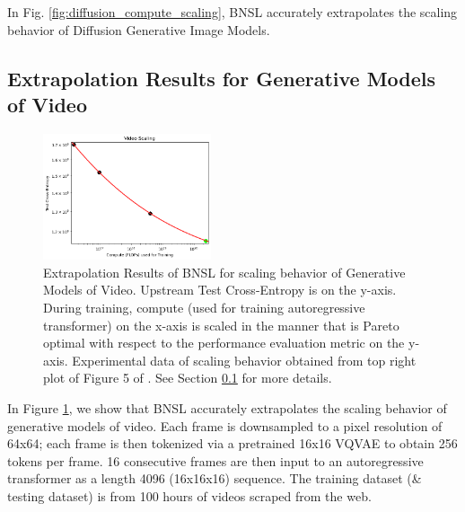 \documentclass{article} %
\begin{document}
\vspace{-2.0mm}

In Fig. \ref{fig:diffusion_compute_scaling}, BNSL accurately extrapolates the scaling behavior of Diffusion Generative Image Models.

\FloatBarrier

\subsection{Extrapolation Results for Generative Models of Video}
\label{section:video}

\vspace{-3.3mm}

\begin{figure}[htbp]
    \centering
\includegraphics[width=0.44\textwidth]{figures/video/video__compute.png}

\vspace{-3.3mm}

    \caption{
Extrapolation Results of BNSL for scaling behavior of Generative Models of Video. Upstream Test Cross-Entropy is on the y-axis. During training, compute (used for training autoregressive transformer) on the x-axis is scaled in the manner that is Pareto optimal with respect to the performance evaluation metric on the y-axis. Experimental data of scaling behavior obtained from top right plot of Figure 5 of \cite{2020arXiv201014701H}. See Section \ref{section:video} for more details.
    }
    \label{fig:video_compute_scaling}
\end{figure}

\vspace{-2.0mm}

In Figure \ref{fig:video_compute_scaling}, we show that BNSL accurately extrapolates the scaling behavior of generative models of video. Each frame is downsampled to a pixel resolution of 64x64; each frame is then tokenized via a pretrained 16x16 VQVAE \citep{van2017neural} to obtain 256 tokens per frame. 16 consecutive frames are then input to an autoregressive transformer as a length 4096 (16x16x16) sequence. The training dataset (\& testing dataset) is from 100 hours of videos scraped from the web.
\end{document}
